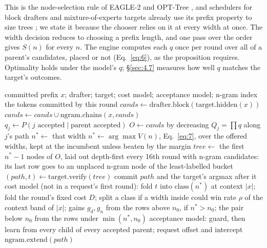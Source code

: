 \documentclass[10pt,twocolumn,letterpaper]{article}
\begin{document}
This is the node-selection rule of EAGLE-2 \cite{li2024eagleb} and OPT-Tree \cite{wang2025opt}, and schedulers for block drafters and mixture-of-experts targets already use its prefix property to size trees \cite{pan2026making,oh2026bastion,zhou2026treespark}; we state it because the chooser relies on it at every width at once. The width decision reduces to choosing a prefix length, and one pass over the order gives $S(n)$ for every $n$. The engine computes each $q$ once per round over all of a parent's candidates, placed or not (Eq.~\eqref{eq:6}), as the proposition requires. Optimality holds under the model's $q$; \S\ref{sec:4.7} measures how well $q$ matches the target's outcomes.

\begin{algorithm*}[t]
\caption{One AdaSpark round. The widths offered to the chooser are the widths the cost model has learned (\S\ref{sec:3.2}). The head-based estimate is the drafter's confidence head with a per-request offset, and the guard decides which of it and the fitted model prices the tree (\S\ref{sec:3.3}); the incumbent is the width the chooser holds (\S\ref{sec:3.4}).}
\label{alg:round}
\small
\begin{algorithmic}[1]
\Require committed prefix $x$; drafter; target; cost model; acceptance model; n-gram index
\Ensure the tokens committed by this round
\State $\mathit{cands} \gets \mathrm{drafter.block}(\mathrm{target.hidden}(x))$ 
\State $\mathit{cands} \gets \mathit{cands} \cup \mathrm{ngram.chains}(x, \mathit{cands})$ 
\State $q_j \gets P(j \text{ accepted} \mid \text{parent accepted})$ 
\State $O \gets \mathit{cands}$ by decreasing $Q_j = \prod q$ along $j$'s path 
  \State $n^* \gets$ that width 
\Else
  \State $n^* \gets \arg\max V(n)$, Eq.~\eqref{eq:7}, over the offered widths, kept at the incumbent unless beaten by the margin
\EndIf
\State $\mathit{tree} \gets$ the first $n^* - 1$ nodes of $O$, laid out depth-first
\State every 16th round with n-gram candidates: its last row goes to an unplaced n-gram node of the least-labelled bucket
\State $(\mathit{path}, t) \gets \mathrm{target.verify}(\mathit{tree})$ 
\State commit $\mathit{path}$ and the target's argmax after it
\State cost model (not in a request's first round): fold $t$ into $\mathrm{class}(n^*)$ at context $|x|$; fold the round's fixed cost $D$; split a class if a width inside could win
\State rate $\rho$ of the context band of $|x|$; gains $g_d, g_n$ from the rows above $n_0$, if $n^* > n_0$; the pair below $n_0$ from the rows under $\min(n^*, n_0)$
\State acceptance model: guard, then learn from every child of every accepted parent; request offset and intercept
\State $\mathrm{ngram.extend}(\mathit{path})$
\end{algorithmic}
\end{algorithm*}
\end{document}
